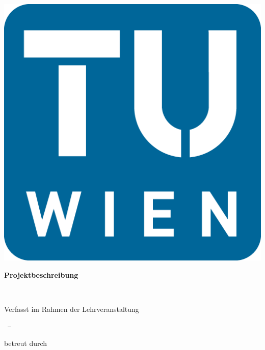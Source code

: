 \begin{titlepage}
		\begin{center}
			\includegraphics[scale=0.9]{TU-Signet.png}
			
			\vspace*{\fill}
			
			{\LARGE \bfseries Projektbeschreibung}
			
			\vspace*{2cm}
			
			{\Huge \bfseries \prsubject}
			
			\vspace*{0.5cm}
			
			{\Large \prdescription}\\
			
			\vspace*{2cm}
			
			{\Large Verfasst im Rahmen der Lehrveranstaltung}\\
			
			\vspace*{\fill}
			
			{\large \lva~--~\lvanr}
			
			\vspace*{\fill}
			
			{\Large betreut durch}\\
			

\end{center}
\end{titlepage}
